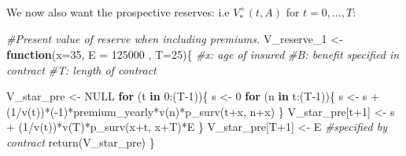 \documentclass[
]{article}
\newenvironment{Shaded}{\begin{snugshade}}{\end{snugshade}}
\newcommand{\AttributeTok}[1]{\textcolor[rgb]{0.77,0.63,0.00}{#1}}
\newcommand{\CommentTok}[1]{\textcolor[rgb]{0.56,0.35,0.01}{\textit{#1}}}
\newcommand{\ConstantTok}[1]{\textcolor[rgb]{0.00,0.00,0.00}{#1}}
\newcommand{\ControlFlowTok}[1]{\textcolor[rgb]{0.13,0.29,0.53}{\textbf{#1}}}
\newcommand{\DecValTok}[1]{\textcolor[rgb]{0.00,0.00,0.81}{#1}}
\newcommand{\FunctionTok}[1]{\textcolor[rgb]{0.00,0.00,0.00}{#1}}
\newcommand{\NormalTok}[1]{#1}
\newcommand{\OtherTok}[1]{\textcolor[rgb]{0.56,0.35,0.01}{#1}}
\newcommand{\SpecialCharTok}[1]{\textcolor[rgb]{0.00,0.00,0.00}{#1}}
\begin{document}
We now also want the prospective reserves: i.e \(V_{*}^{+}(t,A)\) for
\(t = 0, \dots , T\):

\begin{Shaded}
\begin{Highlighting}[]
\CommentTok{\#Present value of reserve when including premiums. }
\NormalTok{V\_reserve\_1 }\OtherTok{\textless{}{-}} \ControlFlowTok{function}\NormalTok{(}\AttributeTok{x=}\DecValTok{35}\NormalTok{, }\AttributeTok{E =} \DecValTok{125000}\NormalTok{ , }\AttributeTok{T=}\DecValTok{25}\NormalTok{)\{}
  \CommentTok{\#x: age of insured}
  \CommentTok{\#B: benefit specified in contract}
  \CommentTok{\#T: length of contract }
  
\NormalTok{  V\_star\_pre }\OtherTok{\textless{}{-}} \ConstantTok{NULL}
  \ControlFlowTok{for}\NormalTok{ (t }\ControlFlowTok{in} \DecValTok{0}\SpecialCharTok{:}\NormalTok{(T}\DecValTok{{-}1}\NormalTok{))\{}
\NormalTok{    s }\OtherTok{\textless{}{-}} \DecValTok{0} 
    \ControlFlowTok{for}\NormalTok{ (n }\ControlFlowTok{in}\NormalTok{ t}\SpecialCharTok{:}\NormalTok{(T}\DecValTok{{-}1}\NormalTok{))\{}
\NormalTok{      s }\OtherTok{\textless{}{-}}\NormalTok{ s }\SpecialCharTok{+}\NormalTok{ (}\DecValTok{1}\SpecialCharTok{/}\FunctionTok{v}\NormalTok{(t))}\SpecialCharTok{*}\NormalTok{(}\SpecialCharTok{{-}}\DecValTok{1}\NormalTok{)}\SpecialCharTok{*}\NormalTok{premium\_yearly}\SpecialCharTok{*}\FunctionTok{v}\NormalTok{(n)}\SpecialCharTok{*}\FunctionTok{p\_surv}\NormalTok{(t}\SpecialCharTok{+}\NormalTok{x, n}\SpecialCharTok{+}\NormalTok{x)}
\NormalTok{    \}}
\NormalTok{    V\_star\_pre[t}\SpecialCharTok{+}\DecValTok{1}\NormalTok{] }\OtherTok{\textless{}{-}}\NormalTok{ s  }\SpecialCharTok{+}\NormalTok{ (}\DecValTok{1}\SpecialCharTok{/}\FunctionTok{v}\NormalTok{(t))}\SpecialCharTok{*}\FunctionTok{v}\NormalTok{(T)}\SpecialCharTok{*}\FunctionTok{p\_surv}\NormalTok{(x}\SpecialCharTok{+}\NormalTok{t, x}\SpecialCharTok{+}\NormalTok{T)}\SpecialCharTok{*}\NormalTok{E }
\NormalTok{  \}}
\NormalTok{  V\_star\_pre[T}\SpecialCharTok{+}\DecValTok{1}\NormalTok{] }\OtherTok{\textless{}{-}}\NormalTok{ E }\CommentTok{\#specified by contract }
  \FunctionTok{return}\NormalTok{(V\_star\_pre)}
\NormalTok{\} }
\end{Highlighting}
\end{Shaded}

\newpage
\end{document}
